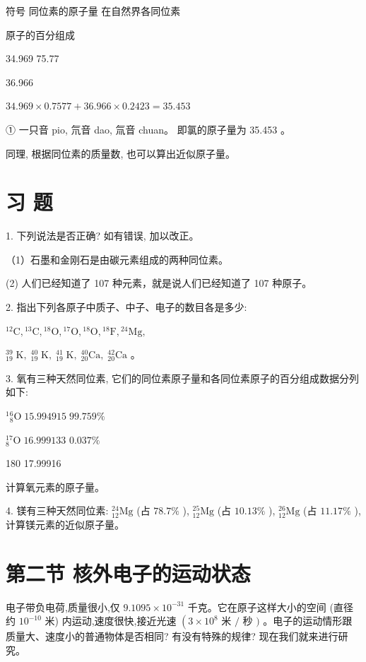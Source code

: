 \documentclass[10pt]{article}
\begin{document}
符号 同位素的原子量 在自然界各同位素

原子的百分组成

34.969 75.77

36.966

\({34.969} \times {0.7577} + {36.966} \times {0.2423} = {35.453}\)

① 一只音 pio, 氘音 dao, 氚音 chuan。 即氯的原子量为 35.453 。

同理, 根据同位素的质量数, 也可以算出近似原子量。

\section*{习 题}

1. 下列说法是否正确? 如有错误, 加以改正。

（1）石墨和金刚石是由碳元素组成的两种同位素。

(2) 人们已经知道了 107 种元素，就是说人们已经知道了 107 种原子。

2. 指出下列各原子中质子、中子、电子的数目各是多少:

\({}^{12}\mathrm{C},{}^{13}\mathrm{C},{}^{18}\mathrm{O},{}^{17}\mathrm{O},{}^{18}\mathrm{O},{}^{18}\mathrm{F},{}^{24}\mathrm{{Mg}},\)

\({}_{19}^{39}\mathrm{\;K},\;{}_{19}^{40}\mathrm{\;K},\;{}_{19}^{41}\mathrm{\;K},\;{}_{20}^{40}\mathrm{{Ca}},\;{}_{20}^{42}\mathrm{{Ca}}\) 。

3. 氧有三种天然同位素, 它们的同位素原子量和各同位素原子的百分组成数据分列如下:

\({}^{1}{}_{8}^{6}\mathrm{O}\;{15.994915}\;{99.759}\%\)

\({}_{8}^{17}\mathrm{O}\;{16.999133}\) \({0.037}\%\)

180 17.99916

计算氧元素的原子量。

4. 镁有三种天然同位素: \({}_{12}^{24}\mathrm{{Mg}}\) (占 \({78.7}\%\) ), \({}_{12}^{25}\mathrm{{Mg}}\) (占 \({10.13}\%\) ), \({}_{12}^{26}\mathrm{{Mg}}\) (占 \({11.17}\%\) ), 计算镁元素的近似原子量。

\section*{第二节 核外电子的运动状态}

电子带负电荷,质量很小,仅 \({9.1095} \times {10}^{-{31}}\) 千克。它在原子这样大小的空间 (直径约 \({10}^{-{10}}\) 米) 内运动,速度很快,接近光速 \(\left( {3 \times {10}^{8}}\right.\) 米 \(/\) 秒 \()\) 。电子的运动情形跟质量大、速度小的普通物体是否相同? 有没有特殊的规律? 现在我们就来进行研究。
\end{document}
